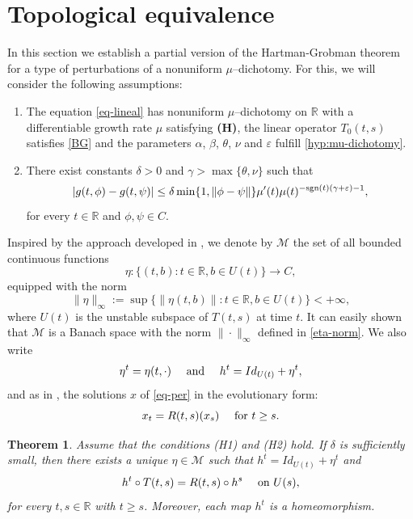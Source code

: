\documentclass[9pt]{amsart}
\newtheorem{theorem}{Theorem}
\numberwithin{equation}{section}
\numberwithin{lemma}{section}
\begin{document}
\section{Topological equivalence}

In this section we establish a partial version of the Hartman-Grobman theorem for a type of perturbations of a nonuniform $\mu$--dichotomy. For this, we will consider the following assumptions:

\begin{enumerate}
    \item[(H1)] The equation \eqref{eq-lineal} has nonuniform $\mu$--dichotomy on $\mathbb{R}$ with a differentiable growth rate $\mu$ satisfying \textbf{(H)}, the linear operator
 $T_0(t,s)$ satisfies  \eqref{BG}  and  the parameters $\alpha$, $\beta$, $\theta$, $\nu$ and $\varepsilon$ fulfill \eqref{hyp:mu-dichotomy}.

    \item[(H2)] There exist constants $\delta>0$ and $\gamma>\max\{\theta,\nu\}$ such that
    \begin{equation}\label{g-cond}
        |g(t,\phi)-g(t,\psi)|\leq \delta\min\{1,\|\phi-\psi\|\}\mu'(t)\mu(t)^{-\textnormal{sgn}(t)(\gamma+\varepsilon)-1},
    \end{equation}
    for every $t\in\mathbb{R}$ and $\phi, \psi\in C$.
\end{enumerate}
Inspired by the approach developed in \cite{B-v-per}, we denote by $\mathcal{M}$ the set of all bounded continuous functions
\begin{equation*}
   \eta\colon\{(t,b) : t\in\mathbb{R}, b\in U(t)\}\to C, 
\end{equation*}
equipped with the norm
\begin{equation}\label{eta-norm}
    \|\eta\|_{\infty}:=\sup\{\|\eta(t,b)\| : t\in\mathbb{R}, b\in U(t)\}<+\infty,
\end{equation}
where $U(t)$ is the unstable subspace of $T(t,s)$ at time $t$. It can easily shown that $\mathcal{M}$ is a Banach space with the norm $\|\cdot\|_{\infty}$ defined in  \eqref{eta-norm}. We also write
$$\eta^t=\eta(t,\cdot) \quad \textnormal{ and } \quad h^t=Id_{U(t)} + \eta^t,$$
and as in \cite{B-v-per}, the solutions $x$ of \eqref{eq-per} in the evolutionary form:
\begin{equation*}
    x_t=R(t,s)(x_s) \quad \textnormal{ for } t\geq s.
\end{equation*}


\begin{theorem}\label{Th-Equiv}
    Assume that the conditions (H1) and (H2) hold. If $\delta$ is sufficiently small, then there exists a unique $\eta\in\mathcal{M}$ such that $h^{t}=Id_{U(t)}+\eta^t$ and 
    \begin{equation}\label{conj}
        h^t\circ T(t,s) = R(t,s)\circ h^s \quad \textnormal{ on } U(s),
    \end{equation}
    for every $t, s\in\mathbb{R}$ with $t\geq s$. Moreover, each map $h^t$ is a homeomorphism.
\end{theorem}
\end{document}
